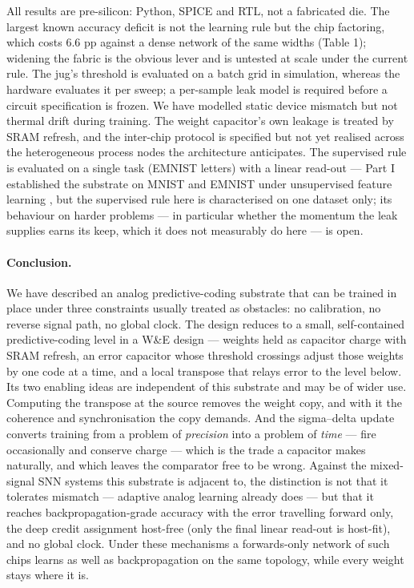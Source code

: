 \documentclass[11pt]{article}
\begin{document}
All results are pre-silicon: Python, SPICE and RTL, not a fabricated
die. The largest known accuracy deficit is not the learning rule but the
chip factoring, which costs \(6.6\) pp against a dense network of the
same widths (Table 1); widening the fabric is the obvious lever and is
untested at scale under the current rule. The jug's threshold is
evaluated on a batch grid in simulation, whereas the hardware evaluates
it per sweep; a per-sample leak model is required before a circuit
specification is frozen. We have modelled static device mismatch but not
thermal drift during training. The weight capacitor's own leakage is
treated by SRAM refresh, and the inter-chip protocol is specified but
not yet realised across the heterogeneous process nodes the architecture
anticipates. The supervised rule is evaluated on a single task (EMNIST
letters) with a linear read-out --- Part I established the substrate on
MNIST and EMNIST under unsupervised feature learning
\cite{dobney2026analog}, but the supervised rule here is characterised
on one dataset only; its behaviour on harder problems --- in particular
whether the momentum the leak supplies earns its keep, which it does not
measurably do here --- is open.

\hypertarget{conclusion.}{%
\paragraph{Conclusion.}\label{conclusion.}}

We have described an analog predictive-coding substrate that can be
trained in place under three constraints usually treated as obstacles:
no calibration, no reverse signal path, no global clock. The design
reduces to a small, self-contained predictive-coding level in a W\&E
design --- weights held as capacitor charge with SRAM refresh, an error
capacitor whose threshold crossings adjust those weights by one code at
a time, and a local transpose that relays error to the level below. Its
two enabling ideas are independent of this substrate and may be of wider
use. Computing the transpose at the source removes the weight copy, and
with it the coherence and synchronisation the copy demands. And the
sigma--delta update converts training from a problem of \emph{precision}
into a problem of \emph{time} --- fire occasionally and conserve charge
--- which is the trade a capacitor makes naturally, and which leaves the
comparator free to be wrong. Against the mixed-signal SNN systems this
substrate is adjacent to, the distinction is not that it tolerates
mismatch --- adaptive analog learning already does --- but that it
reaches backpropagation-grade accuracy with the error travelling forward
only, the deep credit assignment host-free (only the final linear
read-out is host-fit), and no global clock. Under these mechanisms a
forwards-only network of such chips learns as well as backpropagation on
the same topology, while every weight stays where it is.
\end{document}
